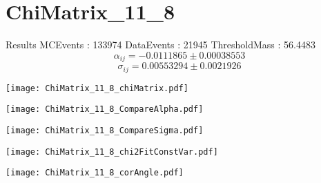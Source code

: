 \documentclass[a4paper,12pt]{article}
\begin{document}
\section{ChiMatrix\_11\_8}
\begin{minipage}{0.49\linewidth} Results \newline
MCEvents : 133974\newline
DataEvents : 21945 \newline
ThresholdMass : 56.4483\\
$$\alpha_{ij} = -0.0111865\pm 0.00038553$$
$$\sigma_{ij} = 0.00553294\pm 0.0021926$$
\end{minipage}\hfill
\begin{minipage}{0.49\linewidth} 
\texttt{[image: ChiMatrix\_11\_8\_chiMatrix.pdf]}\\
\end{minipage}
\hfill
\begin{minipage}{0.49\linewidth} 
\texttt{[image: ChiMatrix\_11\_8\_CompareAlpha.pdf]}\\
\end{minipage}
\hfill
\begin{minipage}{0.49\linewidth} 
\texttt{[image: ChiMatrix\_11\_8\_CompareSigma.pdf]}\\
\end{minipage}
\begin{minipage}{0.49\linewidth} 
\texttt{[image: ChiMatrix\_11\_8\_chi2FitConstVar.pdf]}\\
\end{minipage}
\hfill
\begin{minipage}{0.49\linewidth} 
\texttt{[image: ChiMatrix\_11\_8\_corAngle.pdf]}\\
\end{minipage}
\end{document}

